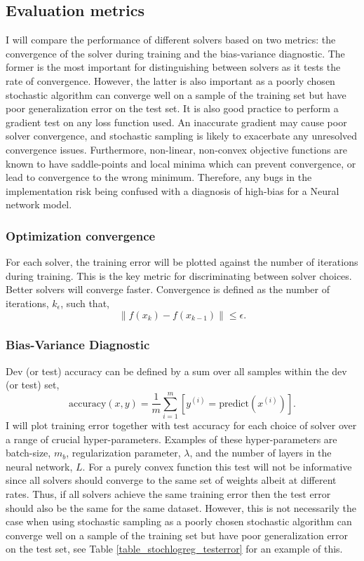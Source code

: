 \documentclass[nohyperref]{article}
\theoremstyle{plain}
\theoremstyle{definition}
\theoremstyle{remark}
\begin{document}
\subsection{Evaluation metrics}
I will compare the performance of different solvers based on two metrics: the convergence of the solver during training and the bias-variance diagnostic. The former is the most important for distinguishing between solvers as it tests the rate of convergence. However, the latter is also important as a poorly chosen stochastic algorithm can converge well on a sample of the training set but have poor generalization error on the test set.  It is also good practice to perform a gradient test on any loss function used.  An inaccurate gradient may cause poor solver convergence, and stochastic sampling is likely to exacerbate any unresolved convergence issues. Furthermore, non-linear, non-convex objective functions are known to have saddle-points and local minima which can prevent convergence, or lead to convergence to the wrong minimum. Therefore, any bugs in the implementation risk being confused with a diagnosis of high-bias for a Neural network model.

\subsubsection*{Optimization convergence}\label{metric_conv_curve}
For each solver, the training error will be plotted against the number of iterations during training. This is the key metric for discriminating between solver choices. Better solvers will converge faster. Convergence is defined as the number of iterations, $k_{\epsilon}$, such that,
\begin{equation}
\| f(x_{k})-f(x_{k-1}) \| \le \epsilon.
\end{equation}

\subsubsection*{Bias-Variance Diagnostic}\label{bias_variance}
Dev (or test) accuracy can be defined by a sum over all samples within the dev (or test) set,
\begin{equation}
\textrm{accuracy}(x,y)=\frac{1}{m}\sum_{i=1}^{m}[y^{(i)}=\textrm{predict}(x^{(i)})].
\end{equation}
I will plot training error together with test accuracy for each choice of solver over a range of crucial hyper-parameters. Examples of these hyper-parameters are batch-size, $m_b$, regularization parameter, $\lambda$, and the number of layers in the neural network, $L$. For a purely convex function this test will not be informative since all solvers should converge to the same set of weights albeit at different rates. Thus, if all solvers achieve the same training error then the test error should also be the same for the same dataset. However, this is not necessarily the case when using stochastic sampling as a poorly chosen stochastic algorithm can converge well on a sample of the training set but have poor generalization error on the test set, see Table \ref{table_stochlogreg_testerror} for an example of this.
\end{document}
